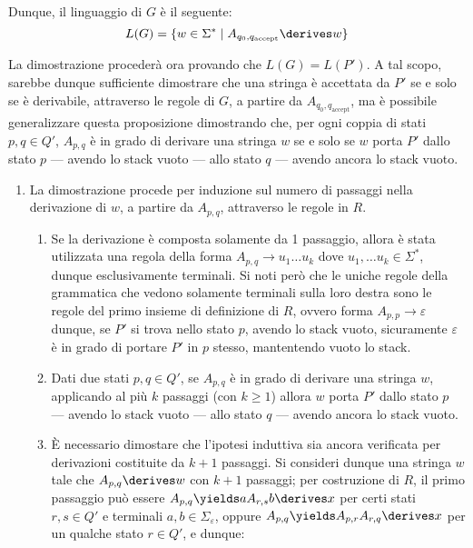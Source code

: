 \documentclass[a4paper, 12pt]{report}
\begin{document}
{        Dunque, il linguaggio di $G$ è il seguente: $$L(G) = \{w \in \Sigma^* \mid A_{q_0, q_{\mathrm{accept}}} \derives w\}$$

        La dimostrazione procederà ora provando che $L(G) = L(P')$. A tal scopo, sarebbe dunque sufficiente dimostrare che una stringa è accettata da $P'$ se e solo se è derivabile, attraverso le regole di $G$, a partire da $A_{q_0, q_\mathrm{accept}}$, ma è possibile generalizzare questa proposizione dimostrando che, per ogni coppia di stati $p, q \in Q'$, $A_{p,q}$ è in grado di derivare una stringa $w$ se e solo se $w$ porta $P'$ dallo stato $p$ --- avendo lo stack vuoto --- allo stato $q$ --- avendo ancora lo stack vuoto.

        \begin{enumerate}[label=]
            \item {} La dimostrazione procede per induzione sul numero di passaggi nella derivazione di $w$, a partire da $A_{p,q}$, attraverso le regole in $R$.
                \begin{enumerate}[label=]
                    \item {} Se la derivazione è composta solamente da 1 passaggio, allora è stata utilizzata una regola della forma $A_{p,q} \to u_1 \ldots u_k$ dove $u_1, \ldots u_k \in \Sigma^*$, dunque esclusivamente terminali. Si noti però che le uniche regole della grammatica che vedono solamente terminali sulla loro destra sono le regole del primo insieme di definizione di $R$, ovvero forma $A_{p,p} \to \varepsilon$ dunque, se $P'$ si trova nello stato $p$, avendo lo stack vuoto, sicuramente $\varepsilon$ è in grado di portare $P'$ in $p$ stesso, mantentendo vuoto lo stack.
                    \item {} Dati due stati $p, q \in Q'$, se $A_{p,q}$ è in grado di derivare una stringa $w$, applicando al più $k$ passaggi (con $k \ge 1$) allora $w$ porta $P'$ dallo stato $p$ --- avendo lo stack vuoto --- allo stato $q$ --- avendo ancora lo stack vuoto.
                    \item {} È necessario dimostare che l'ipotesi induttiva sia ancora verificata per derivazioni costituite da $k + 1$ passaggi. Si consideri dunque una stringa $w$ tale che $A_{p,q} \derives w$ con $k + 1$ passaggi; per costruzione di $R$, il primo passaggio può essere $A_{p,q} \yields aA_{r,s}b \derives x$ per certi stati $r, s \in Q'$ e terminali $a, b \in \Sigma_\varepsilon$, oppure $A_{p,q} \yields A_{p,r} A_{r,q} \derives x$ per un qualche stato $r \in Q'$, e dunque:


\end{enumerate}
\end{enumerate}}
\end{document}
